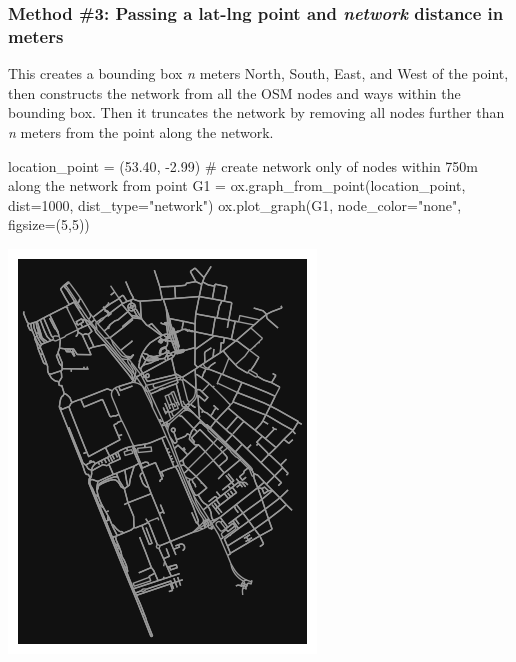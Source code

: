 \documentclass[
  letterpaper,
  DIV=11,
  numbers=noendperiod]{scrreprt}
\newenvironment{Shaded}{\begin{snugshade}}{\end{snugshade}}
\newcommand{\CommentTok}[1]{\textcolor[rgb]{0.37,0.37,0.37}{#1}}
\newcommand{\DecValTok}[1]{\textcolor[rgb]{0.68,0.00,0.00}{#1}}
\newcommand{\FloatTok}[1]{\textcolor[rgb]{0.68,0.00,0.00}{#1}}
\newcommand{\NormalTok}[1]{\textcolor[rgb]{0.00,0.23,0.31}{#1}}
\newcommand{\OperatorTok}[1]{\textcolor[rgb]{0.37,0.37,0.37}{#1}}
\newcommand{\StringTok}[1]{\textcolor[rgb]{0.13,0.47,0.30}{#1}}
\begin{document}
\subsubsection{\texorpdfstring{Method \#3: Passing a lat-lng point and
\emph{network} distance in
meters}{Method \#3: Passing a lat-lng point and network distance in meters}}\label{method-3-passing-a-lat-lng-point-and-network-distance-in-meters}

This creates a bounding box \emph{n} meters North, South, East, and West
of the point, then constructs the network from all the OSM nodes and
ways within the bounding box. Then it truncates the network by removing
all nodes further than \emph{n} meters from the point along the network.

\begin{Shaded}
\begin{Highlighting}[]
\NormalTok{location\_point }\OperatorTok{=}\NormalTok{ (}\FloatTok{53.40}\NormalTok{, }\OperatorTok{{-}}\FloatTok{2.99}\NormalTok{)}
\CommentTok{\# create network only of nodes within 750m along the network from point}
\NormalTok{G1 }\OperatorTok{=}\NormalTok{ ox.graph\_from\_point(location\_point, dist}\OperatorTok{=}\DecValTok{1000}\NormalTok{, dist\_type}\OperatorTok{=}\StringTok{"network"}\NormalTok{)}
\NormalTok{ox.plot\_graph(G1, node\_color}\OperatorTok{=}\StringTok{"none"}\NormalTok{, figsize}\OperatorTok{=}\NormalTok{(}\DecValTok{5}\NormalTok{,}\DecValTok{5}\NormalTok{))}
\end{Highlighting}
\end{Shaded}

\includegraphics{labs/w07_OSM_files/figure-pdf/cell-8-output-1.png}
\end{document}
